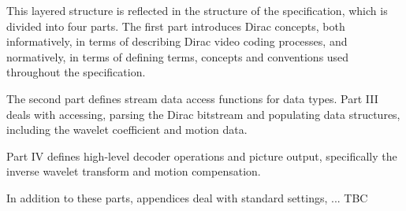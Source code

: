 This layered structure is reflected in the structure of the specification,
which is divided into four parts. The first part introduces Dirac concepts,
both informatively, in terms of describing Dirac video coding processes, and
normatively, in terms of defining terms, concepts and conventions used 
throughout the specification.

The second part defines stream data access functions for data types. Part III
deals with accessing, parsing the Dirac bitstream and populating data
structures, including the wavelet coefficient and motion data.

Part IV defines high-level decoder operations and picture output, specifically the
inverse wavelet transform and motion compensation.

In addition to these parts, appendices deal with standard settings, ... TBC
